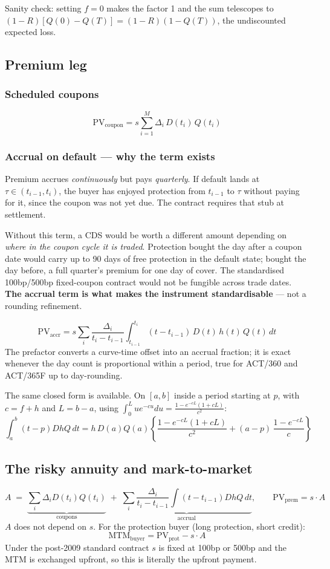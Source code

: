 \documentclass[11pt,a4paper]{article}
\newcommand{\keypoint}[1]{%
  \par\vspace{0.4em}\noindent
  \colorbox{codebg}{\parbox{\dimexpr\linewidth-2\fboxsep}{\small #1}}%
  \par\vspace{0.5em}}
\begin{document}
Sanity check: setting $f = 0$ makes the factor 1 and the sum telescopes to
$(1-R)[Q(0)-Q(T)] = (1-R)(1-Q(T))$, the undiscounted expected loss.

\subsection{Premium leg}

\subsubsection*{Scheduled coupons}
\[
\text{PV}_{\text{coupon}} = s\sum_{i=1}^{M}\Delta_i\,D(t_i)\,Q(t_i)
\]

\subsubsection*{Accrual on default --- why the term exists}

Premium accrues \emph{continuously} but pays \emph{quarterly}. If default lands at
$\tau \in (t_{i-1}, t_i)$, the buyer has enjoyed protection from $t_{i-1}$ to $\tau$ without
paying for it, since the coupon was not yet due. The contract requires that stub at
settlement.

\keypoint{Without this term, a CDS would be worth a different amount depending on
\emph{where in the coupon cycle it is traded}. Protection bought the day after a coupon date
would carry up to 90 days of free protection in the default state; bought the day before, a
full quarter's premium for one day of cover. The standardised 100bp/500bp fixed-coupon
contract would not be fungible across trade dates. \textbf{The accrual term is what makes the
instrument standardisable} --- not a rounding refinement.}

\[
\text{PV}_{\text{accr}} = s\sum_i \frac{\Delta_i}{t_i - t_{i-1}}
\int_{t_{i-1}}^{t_i}(t - t_{i-1})\,D(t)\,h(t)\,Q(t)\,dt
\]
The prefactor converts a curve-time offset into an accrual fraction; it is exact whenever the
day count is proportional within a period, true for ACT/360 and ACT/365F up to day-rounding.

The same closed form is available. On $[a,b]$ inside a period starting at $p$, with $c=f+h$
and $L = b-a$, using $\int_0^L u e^{-cu}du = \frac{1-e^{-cL}(1+cL)}{c^2}$:
\[
\int_a^b (t-p)DhQ\,dt
= h\,D(a)Q(a)\left\{\frac{1 - e^{-cL}(1+cL)}{c^2} + (a-p)\,\frac{1-e^{-cL}}{c}\right\}
\]

\subsection{The risky annuity and mark-to-market}
\[
A \;=\; \underbrace{\sum_i \Delta_i D(t_i)Q(t_i)}_{\text{coupons}}
\;+\; \underbrace{\sum_i \frac{\Delta_i}{t_i-t_{i-1}}\int(t-t_{i-1})DhQ\,dt}_{\text{accrual}},
\qquad \text{PV}_{\text{prem}} = s\cdot A
\]
$A$ does not depend on $s$. For the protection buyer (long protection, short credit):
\[
\text{MTM}_{\text{buyer}} = \text{PV}_{\text{prot}} - s\cdot A
\]
Under the post-2009 standard contract $s$ is fixed at 100bp or 500bp and the MTM is exchanged
upfront, so this is literally the upfront payment.
\end{document}
